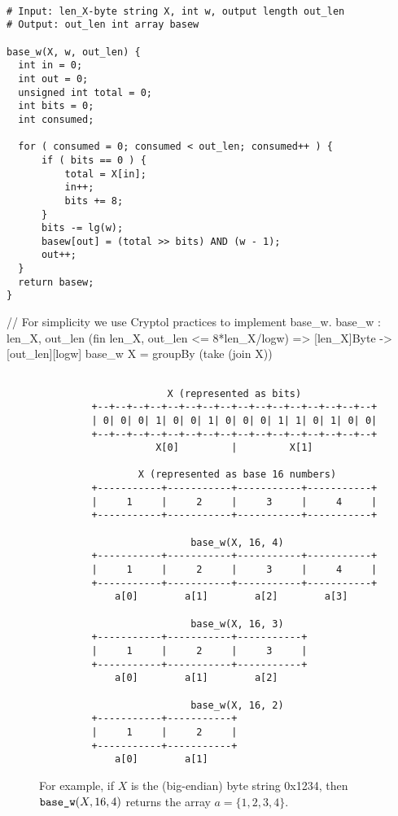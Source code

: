 \begin{lstlisting}[label=alg:basew, language=pseudoc,
                   caption=\basew \ -- Computing the base-$w$ representation]

# Input: len_X-byte string X, int w, output length out_len
# Output: out_len int array basew

base_w(X, w, out_len) {
  int in = 0;
  int out = 0;
  unsigned int total = 0;
  int bits = 0;
  int consumed;

  for ( consumed = 0; consumed < out_len; consumed++ ) {
      if ( bits == 0 ) {
          total = X[in];
          in++;
          bits += 8;
      }
      bits -= lg(w);
      basew[out] = (total >> bits) AND (w - 1);
      out++;
  }
  return basew;
}
\end{lstlisting}

\begin{code}
  // For simplicity we use Cryptol practices to implement base_w.
  base_w : {len_X, out_len} (fin len_X, out_len <= 8*len_X/logw) =>
    [len_X]Byte -> [out_len][logw]
  base_w X = groupBy (take (join X))
\end{code}

\begin{figure}[h]
\caption{For example, if $X$ is the (big-endian) byte string 0x1234, then
   $\texttt{base\_w}(X, 16, 4)$ returns the array $a = \{1, 2, 3, 4\}$.}
\begin{verbatim}

                      X (represented as bits)
         +--+--+--+--+--+--+--+--+--+--+--+--+--+--+--+--+
         | 0| 0| 0| 1| 0| 0| 1| 0| 0| 0| 1| 1| 0| 1| 0| 0|
         +--+--+--+--+--+--+--+--+--+--+--+--+--+--+--+--+
                    X[0]         |         X[1]

                 X (represented as base 16 numbers)
         +-----------+-----------+-----------+-----------+
         |     1     |     2     |     3     |     4     |
         +-----------+-----------+-----------+-----------+

                          base_w(X, 16, 4)
         +-----------+-----------+-----------+-----------+
         |     1     |     2     |     3     |     4     |
         +-----------+-----------+-----------+-----------+
             a[0]        a[1]        a[2]        a[3]

                          base_w(X, 16, 3)
         +-----------+-----------+-----------+
         |     1     |     2     |     3     |
         +-----------+-----------+-----------+
             a[0]        a[1]        a[2]

                          base_w(X, 16, 2)
         +-----------+-----------+
         |     1     |     2     |
         +-----------+-----------+
             a[0]        a[1]
\end{verbatim}
\label{example:basew}
\end{figure}

